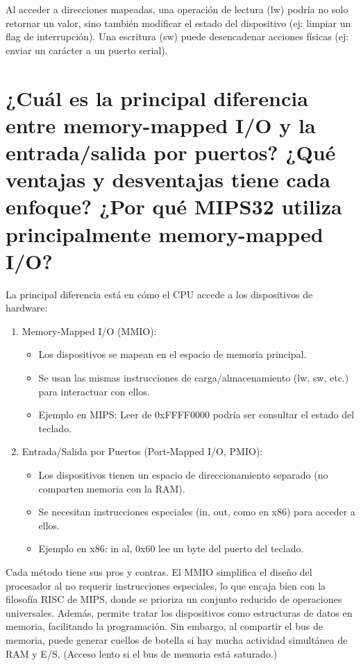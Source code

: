 \documentclass{article}
\begin{document}
Al acceder a direcciones mapeadas, una operación de lectura (lw) podría no solo retornar un valor, sino también modificar el estado del dispositivo (ej: limpiar un flag de interrupción). Una escritura (sw) puede desencadenar acciones físicas (ej: enviar un carácter a un puerto serial).

\section{¿Cuál es la principal diferencia entre memory-mapped I/O y la entrada/salida por puertos? ¿Qué ventajas y desventajas tiene cada enfoque? ¿Por qué MIPS32 utiliza principalmente memory-mapped I/O? }

La principal diferencia está en cómo el CPU accede a los dispositivos de hardware:
\begin{enumerate}
\item Memory-Mapped I/O (MMIO):
\begin{itemize}
\item Los dispositivos se mapean en el espacio de memoria principal.
\item Se usan las mismas instrucciones de carga/almacenamiento (lw, sw, etc.) para interactuar con ellos.
\item Ejemplo en MIPS: Leer de 0xFFFF0000 podría ser consultar el estado del teclado.
\end{itemize}
\item Entrada/Salida por Puertos (Port-Mapped I/O, PMIO):
\begin{itemize}
\item Los dispositivos tienen un espacio de direccionamiento separado (no comparten memoria con la RAM).
\item Se necesitan instrucciones especiales (in, out, como en x86) para acceder a ellos.
\item Ejemplo en x86: in al, 0x60 lee un byte del puerto del teclado.
\end{itemize}
\end{enumerate}

Cada método tiene sus pros y contras. El MMIO simplifica el diseño del procesador al no requerir instrucciones especiales, lo que encaja bien con la filosofía RISC de MIPS, donde se prioriza un conjunto reducido de operaciones universales. Además, permite tratar los dispositivos como estructuras de datos en memoria, facilitando la programación. Sin embargo, al compartir el bus de memoria, puede generar cuellos de botella si hay mucha actividad simultánea de RAM y E/S. (Acceso lento si el bus de memoria está saturado.)\newline
\end{document}

